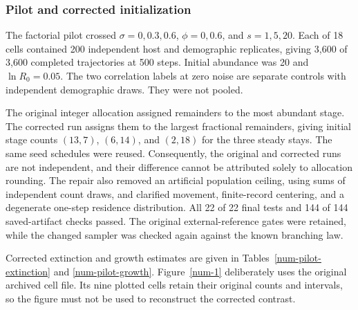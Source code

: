 \subsubsection{Pilot and corrected initialization}
\label{num-esm-pilot}

The factorial pilot crossed $\sigma=0,0.3,0.6$, $\phi=0,0.6$, and
$s=1,5,20$. Each of 18 cells contained 200 independent host and demographic
replicates, giving 3,600 of 3,600 completed trajectories at 500 steps.
Initial abundance was 20 and $\ln R_0=0.05$. The two correlation labels
at zero noise are separate controls with independent demographic draws.
They were not pooled.

The original integer allocation assigned remainders to the most abundant
stage. The corrected run assigns them to the largest fractional remainders,
giving initial stage counts $(13,7)$, $(6,14)$, and $(2,18)$ for the three
steady stays. The same seed schedules were reused. Consequently, the
original and corrected runs are not independent, and their difference
cannot be attributed solely to allocation rounding. The repair also removed
an artificial population ceiling, using sums of independent count draws,
and clarified movement, finite-record centering, and a degenerate
one-step residence distribution. All 22 of 22 final tests and 144 of 144
saved-artifact checks passed. The original external-reference gates were
retained, while the changed sampler was checked again against the known
branching law.

Corrected extinction and growth estimates are given in
Tables~\ref{num-pilot-extinction} and \ref{num-pilot-growth}.
Figure~\ref{num-1} deliberately uses the original archived cell file.
Its nine plotted cells retain their original counts and intervals, so
the figure must not be used to reconstruct the corrected contrast.

